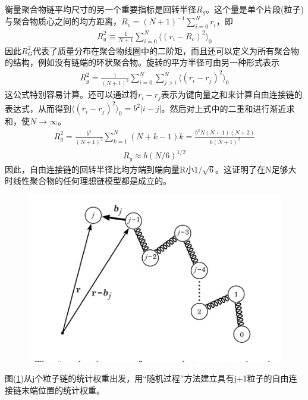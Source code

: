 衡量聚合物链平均尺寸的另一个重要指标是回转半径$R_{g}$。这个量是单个片段(粒子)与聚合物质心之间的均方距离，$R_{c}=(N+1)^{-1} \sum _{i=0}^{N} r_{i}$，即\\
\begin{gather}
R_{g}^2 \equiv \frac{1}{N+1} \sum _{i=0}^{N} \langle (r_{i}- R_{c})^2 \rangle_{0} 
\label{2.14}
\end{gather}
因此$R_{G}^2$代表了质量分布在聚合物线圈中的二阶矩，而且还可以定义为所有聚合物的结构，例如没有链端的环状聚合物。旋转的平方半径可由另一种形式表示\\
\begin{gather}
R_{g}^2=\frac{1}{(N+1)^2} \sum _{i=0}^{N} \sum _{j>i}^{N} \langle (r_{i}- r_{j})^2 \rangle_{0} 
\label{2.15}
\end{gather}
这公式特别容易计算。还可以通过将$r_{i}-r_{j}$表示为键向量之和来计算自由连接链的表达式，从而得到$\langle (r_{i}- r_{j})^2 \rangle_{0}=b^2 |i-j|$。然后对上式中的二重和进行渐近求和，使$N \rightarrow \infty $。\\
\begin{gather}
R_{g}^{2} = \frac{b^2}{(N+1)^2} \sum _{k=1} ^{N} (N+k-1)k=\frac{b^2 N(N+1)(N+2)}{6(N+1)^2}
\end{gather}
\begin{gather}
R_{g}\approx b(N/6)^{1/2}
\label{2.16}
\end{gather}
因此，自由连接链的回转半径比均方端到端向量R小$1/\sqrt{6}$。这证明了在N足够大时线性聚合物的任何理想链模型都是成立的。\\
\begin{figure}[H]
	\centering   
	\includegraphics[width=12cm]{./figures/3.png}
	\caption{ }
	\label{2.2}
\end{figure}
图(\ref{2.2})从j个粒子链的统计权重出发，用“随机过程”方法建立具有j+1粒子的自由连接链末端位置的统计权重。\\

